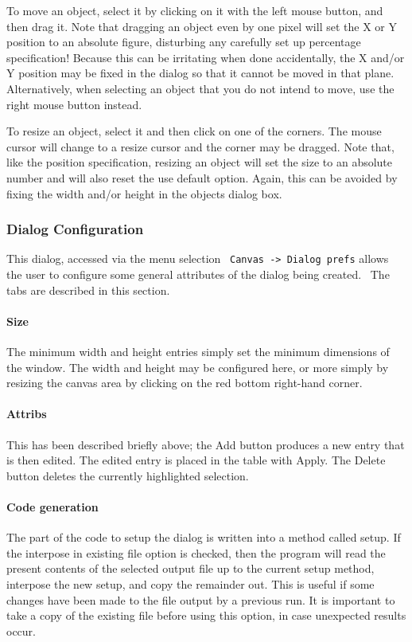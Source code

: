 To move an object, select it by clicking on it with the left mouse
button, and then drag it. Note that dragging an object even by one
pixel will set the X or Y position to an absolute figure, disturbing
any carefully set up percentage specification! Because this can be
irritating when done accidentally, the X and/or Y position may be fixed
in the dialog so that it cannot be moved in that plane. Alternatively,
when selecting an object that you do not intend to move, use the right
mouse button instead.

To resize an object, select it and then click on one of the corners. The
mouse cursor will change to a resize cursor and the corner may be
dragged. Note that, like the position specification, resizing an object
will set the size to an absolute number and will also reset the
{\textquotedbl}use default{\textquotedbl} option. Again, this can be
avoided by fixing the width and/or height in the
object{\textquotesingle}s dialog box.

\subsubsection{Dialog Configuration}

This dialog, accessed via the menu selection \ \texttt{Canvas
-{\textgreater} Dialog prefs} allows the user to configure some general
attributes of the dialog being created. \ The tabs are described in
this section.

\paragraph{Size}
The minimum width and height entries simply set the minimum dimensions
of the window. The width and height may be configured here, or more
simply by resizing the canvas area by clicking on the red bottom
right-hand corner.

\paragraph[Attribs]{Attribs}
This has been described briefly above; the Add button produces a new
entry that is then edited. The edited entry is placed in the table with
Apply. The Delete button deletes the currently highlighted selection.

\paragraph{Code generation}
The part of the code to setup the dialog is written into a method called
setup. If the {\textquotedbl}interpose in existing file{\textquotedbl}
option is checked, then the program will read the present contents of
the selected output file up to the current setup method, interpose the
new setup, and copy the remainder out. This is useful if some changes
have been made to the file output by a previous run. It is
important to take a copy of the existing file before using this option,
in case unexpected results occur.

